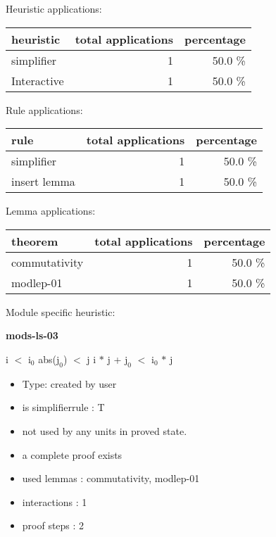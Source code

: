 \documentclass[a4paper]{article}
\begin{document}
\medskip


Heuristic applications:

\begin{supertabular}{l|r|r}
heuristic	& total applications & percentage \\ \hline
simplifier & 1 & 50.0 \% \\
Interactive & 1 & 50.0 \% \\

\end{supertabular}

Rule applications:

\begin{supertabular}{l|r|r}
rule	        & total applications & percentage \\ \hline
simplifier & 1 & 50.0 \% \\
insert lemma & 1 & 50.0 \% \\

\end{supertabular}

Lemma applications:

\begin{supertabular}{l|r|r}
theorem	        & total applications & percentage \\ \hline
commutativity & 1 & 50.0 \% \\
modlep-01 & 1 & 50.0 \% \\

\end{supertabular}

Module specific heuristic:

\pagebreak

{\LARGE\bf mods-ls-03}\label{lemma-mods-ls-03}

\medskip

 \Fol i $<$ $\mbox{i}_{0}$ \And abs($\mbox{j}_{0}$) $<$ j \Imp i $*$ j + $\mbox{j}_{0}$ $<$ $\mbox{i}_{0}$ $*$ j

\begin{itemize}

\item Type: created by user

\item is simplifierrule : T
\item not used by any units in proved state.
\item       a complete proof exists
\item       used lemmas  : commutativity, modlep-01
\item       interactions : 1
\item       proof steps  : 2
\end{itemize}
\end{document}
